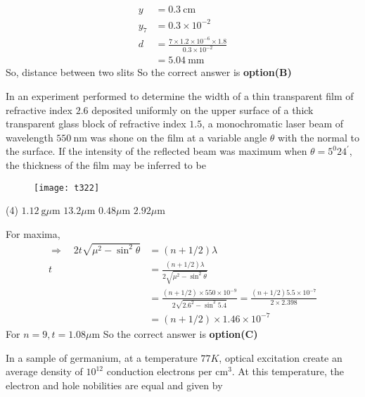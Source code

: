 \begin{questions}
\begin{answer}
$$\begin{aligned}
	y &=0.3 \mathrm{~cm} \\
	y_{7} &=0.3 \times 10^{-2} \\
	d &=\frac{7 \times 1.2 \times 10^{-6} \times 1.8}{0.3 \times 10^{-2}} \\
	&=5.04 \mathrm{~mm}
	\end{aligned}
	$$
	So, distance between two slits
	So the correct answer is \textbf{option(B)}
\end{answer}
\begin{minipage}{\textwidth}
	\question In an experiment performed to determine the width of a thin transparent film of refractive index $2.6$ deposited uniformly on the upper surface of a thick transparent glass block of refractive index $1.5$, a monochromatic laser beam of wavelength $550 \mathrm{~nm}$ was shone on the film at a variable angle $\theta$ with the normal to the surface. If the intensity of the reflected beam was maximum when $\theta=5^{0} 24^{\prime}$, the thickness of the film may be inferred to be
\end{minipage}
\begin{figure}[H]
	\centering
	\texttt{[image: t322]}
\end{figure}
\begin{tasks}(4)
	\task[\textbf{A.}]   $1.12 \mathrm{~g} \mu \mathrm{m}$
	\task[\textbf{B.}] $13.2 \mu \mathrm{m}$
	\task[\textbf{C.}] $0.48 \mu \mathrm{m}$
	\task[\textbf{D.}] $2.92 \mu \mathrm{m}$
\end{tasks}
\begin{answer}
	For maxima,
	$$
	\begin{aligned}
	\Rightarrow \quad 2 t \sqrt{\mu^{2}-\sin ^{2} \theta} &=(n+1 / 2) \lambda \\
	t &=\frac{(n+1 / 2) \lambda}{2 \sqrt{\mu^{2}-\sin ^{2} \theta}} \\
	&=\frac{(n+1 / 2) \times 550 \times 10^{-9}}{2 \sqrt{2.6^{2}-\sin ^{2} 5.4}}=\frac{(n+1 / 2) 5.5 \times 10^{-7}}{2 \times 2.398} \\
	&=(n+1 / 2) \times 1.46 \times 10^{-7}
	\end{aligned}
	$$
	For $n=9, t=1.08 \mu \mathrm{m}$
	So the correct answer is \textbf{option(C)}
\end{answer}
\begin{minipage}{\textwidth}
	\question In a sample of germanium, at a temperature $77 K$, optical excitation create an average density of $10^{12}$ conduction electrons per $\mathrm{cm}^{3}$. At this temperature, the electron and hole nobilities are equal and given by

\end{minipage}
\end{questions}
